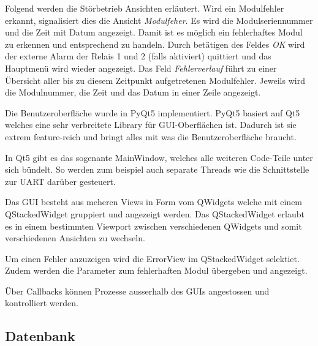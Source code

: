 Folgend werden  die St\"orbetrieb Ansichten erl\"autert. Wird  ein Modulfehler
erkannt,  signalisiert   dies  die  Ansicht  \emph{Modulfeher}. Es   wird  die
Modulseriennummer und die Zeit mit Datum angezeigt. Damit ist es m\"oglich ein
fehlerhaftes Modul zu erkennen  und entsprechend zu handeln. Durch bet\"atigen
des  Feldes  \emph{OK} wird  der  externe  Alarm der  Relais  1  und 2  (falls
aktiviert)  quittiert  und das  Hauptmen\"u  wird  wieder angezeigt. Das  Feld
\emph{Fehlerverlauf}  f\"uhrt  zu  einer   \"Ubersicht  aller  bis  zu  diesem
Zeitpunkt aufgetretenen  Modulfehler. Jeweils wird  die Modulnummer,  die Zeit
und das Datum in einer Zeile angezeigt.

Die Benutzeroberfläche wurde in PyQt5 implementiert. PyQt5 basiert auf Qt5 welches eine sehr verbreitete Library für GUI-Oberflächen ist. Dadurch ist sie extrem feature-reich und bringt alles mit was die Benutzeroberfläche braucht.

In Qt5 gibt es das sogenante MainWindow, welches alle weiteren Code-Teile unter sich bündelt. So werden zum beispiel auch separate Threads wie die Schnittstelle zur UART darüber gesteuert.

Das GUI besteht aus meheren Views in Form vom QWidgets welche mit einem QStackedWidget gruppiert und angezeigt werden. Das QStackedWidget erlaubt es in einem bestimmten Viewport zwischen verschiedenen QWidgets und somit verschiedenen Ansichten zu wechseln.

Um einen Fehler anzuzeigen wird die ErrorView im QStackedWidget selektiet. Zudem werden die Parameter zum fehlerhaften Modul übergeben und angezeigt.

Über Callbacks können Prozesse ausserhalb des GUIs angestossen und kontrolliert werden.

\subsection{Datenbank}
\label{subsec:software:master:database}

